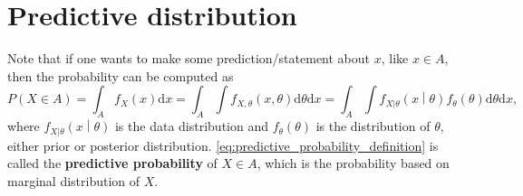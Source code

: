 \documentclass[a4paper,12pt]{article}
\begin{document}
\section{Predictive distribution}
\label{sec:pred-distr}

Note that if one wants to make some prediction/statement about $x$, like $x\in A$, then the probability can be computed as
\begin{equation}
  \label{eq:predictive_probability_definition}
    P\left(X \in A\right) = \int_A f_X\left(x\right)\mathrm{d}x
  = \int_A\int f_{X, \theta}\left(x, \theta\right)\mathrm{d}\theta\mathrm{d}x
  = \int_A\int f_{X|\theta}\left(x\middle|\theta\right)f_\theta\left(\theta\right)\mathrm{d}\theta\mathrm{d}x
  ,
\end{equation}
where $f_{X|\theta}\left(x\middle|\theta\right)$ is the data distribution and $f_\theta\left(\theta\right)$ is the distribution of $\theta$, either prior or posterior distribution. \eqref{eq:predictive_probability_definition} is called the \textbf{predictive probability} of $X\in A$, which is the probability based on marginal distribution of $X$.







\end{document}
